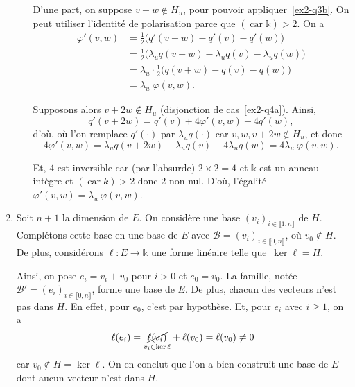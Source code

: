 \documentclass{../../td}
\begin{document}
\begin{enumerate}
\begin{enumerate}
          D'une part, on suppose $v + w \not\in H_u$, pour pouvoir appliquer~\ref{ex2-q3b}.
          On peut utiliser l'identité de polarisation parce que $(\operatorname{car} \mathds{k}) > 2$.
          On a
          \begin{align*}
            \varphi'(v,w) &= \frac{1}{2} \big( q'(v+w) - q'(v) - q'(w)\big) \\
            &= \frac{1}{2} \big( \lambda_u q(v + w) -\lambda_u q(v) - \lambda_u q(w)\big) \\
            &= \lambda_u \cdot \frac{1}{2} \big(q(v+w) - q(v) - q(w)\big) \\
            &= \lambda_u \; \varphi(v,w)
          .\end{align*}

          Supposons alors $v + 2w \not\in H_u$ (disjonction de cas~\ref{ex2-q4a}).
          Ainsi, \[
            q'(v + 2w) = q'(v) + 4 \varphi'(v,w) + 4 q'(w)
            ,\] d'où, où l'on remplace $q'(\cdot)$ par $\lambda_u q(\cdot)$ car $v, w, v + 2 w \not\in H_u$, et donc {\small\[
            4 \varphi'(v,w) = \lambda_u q(v + 2w) - \lambda_u q(v) - 4\lambda_u q(w) = 4 \lambda_u\: \varphi(v,w)
          .\]}

          \vspace{-0.8em}
          Et, $4$ est inversible car (par l'absurde) $2 \times 2 = 4$ et $\mathds{k}$ est un anneau intègre et $(\operatorname{car} k) > 2$ donc $2$ non nul.
          D'où, l'égalité $\varphi'(v,w) = \lambda_u\: \varphi(v,w)$.
      \end{enumerate}
    \item Soit $n + 1$ la dimension de $E$. On considère une base $(v_i)_{i \in \llbracket 1,n\rrbracket}$ de $H$.
      Complétons cette base en une base de $E$ avec $\mathcal{B} = (v_i)_{i \in \llbracket 0,n\rrbracket}$, où $v_0 \not\in H$.
      De plus, considérons $\ell : E \to \mathds{k}$ une forme linéaire telle que~$\ker \ell = H$.
      
      Ainsi, on pose $e_i = v_i + v_0$ pour $i > 0$ et $e_0 = v_0$. La famille, notée $\mathcal{B}' = (e_i)_{i \in \llbracket 0,n\rrbracket}$, forme une base de $E$.
      De plus, chacun des vecteurs n'est pas dans $H$. En effet, pour $e_0$, c'est par hypothèse.
      Et, pour $e_i$ avec $i \ge 1$, on a \[
        \ell(e_i) = \underset{v_i \in \ker \ell}{\cancel{\ell(v_i)}} + \ell(v_0) = \ell(v_0) \neq 0
      \] car $v_0 \not\in H = \ker \ell$.
      On en conclut que l'on a bien construit une base de $E$ dont aucun vecteur n'est dans $H$.


\end{enumerate}
\end{document}
